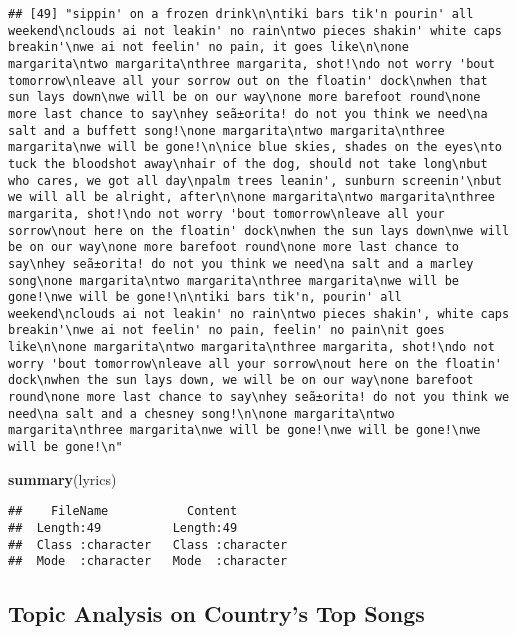 \documentclass[]{article}
\newenvironment{Shaded}{\begin{snugshade}}{\end{snugshade}}
\newcommand{\KeywordTok}[1]{\textcolor[rgb]{0.13,0.29,0.53}{\textbf{#1}}}
\newcommand{\NormalTok}[1]{#1}
\begin{document}
\begin{verbatim}
## [49] "sippin' on a frozen drink\n\ntiki bars tik'n pourin' all weekend\nclouds ai not leakin' no rain\ntwo pieces shakin' white caps breakin'\nwe ai not feelin' no pain, it goes like\n\none margarita\ntwo margarita\nthree margarita, shot!\ndo not worry 'bout tomorrow\nleave all your sorrow out on the floatin' dock\nwhen that sun lays down\nwe will be on our way\none more barefoot round\none more last chance to say\nhey seã±orita! do not you think we need\na salt and a buffett song!\none margarita\ntwo margarita\nthree margarita\nwe will be gone!\n\nice blue skies, shades on the eyes\nto tuck the bloodshot away\nhair of the dog, should not take long\nbut who cares, we got all day\npalm trees leanin', sunburn screenin'\nbut we will all be alright, after\n\none margarita\ntwo margarita\nthree margarita, shot!\ndo not worry 'bout tomorrow\nleave all your sorrow\nout here on the floatin' dock\nwhen the sun lays down\nwe will be on our way\none more barefoot round\none more last chance to say\nhey seã±orita! do not you think we need\na salt and a marley song\none margarita\ntwo margarita\nthree margarita\nwe will be gone!\nwe will be gone!\n\ntiki bars tik'n, pourin' all weekend\nclouds ai not leakin' no rain\ntwo pieces shakin', white caps breakin'\nwe ai not feelin' no pain, feelin' no pain\nit goes like\n\none margarita\ntwo margarita\nthree margarita, shot!\ndo not worry 'bout tomorrow\nleave all your sorrow\nout here on the floatin' dock\nwhen the sun lays down, we will be on our way\none barefoot round\none more last chance to say\nhey seã±orita! do not you think we need\na salt and a chesney song!\n\none margarita\ntwo margarita\nthree margarita\nwe will be gone!\nwe will be gone!\nwe will be gone!\n"
\end{verbatim}

\begin{Shaded}
\begin{Highlighting}[]
\KeywordTok{summary}\NormalTok{(lyrics)}
\end{Highlighting}
\end{Shaded}

\begin{verbatim}
##    FileName           Content         
##  Length:49          Length:49         
##  Class :character   Class :character  
##  Mode  :character   Mode  :character
\end{verbatim}

\hypertarget{topic-analysis-on-countrys-top-songs}{%
\subsection{Topic Analysis on Country's Top
Songs}\label{topic-analysis-on-countrys-top-songs}}
\end{document}
